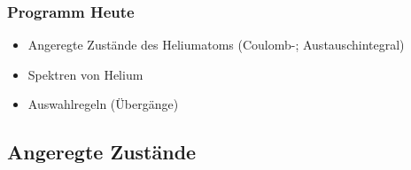 
\subsubsection{Programm Heute}

\begin{itemize}
	\item Angeregte Zustände des Heliumatoms (Coulomb-; Austauschintegral)
	\item Spektren von Helium
	\item Auswahlregeln (Übergänge)
\end{itemize}

\subsection{Angeregte Zustände}

